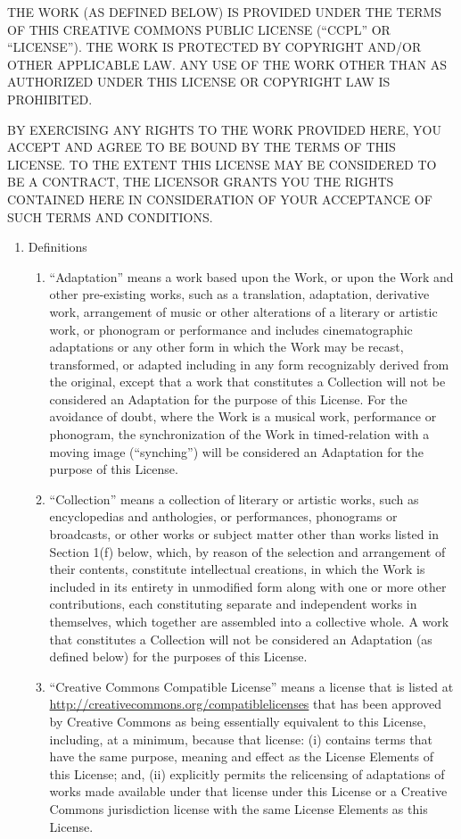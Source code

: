 \documentclass[letterpaper,10pt,english]{manual}
\begin{document}
THE WORK (AS DEFINED BELOW) IS PROVIDED UNDER THE TERMS OF THIS CREATIVE COMMONS PUBLIC LICENSE (``CCPL'' OR ``LICENSE''). THE WORK IS PROTECTED BY COPYRIGHT AND/OR OTHER APPLICABLE LAW. ANY USE OF THE WORK OTHER THAN AS AUTHORIZED UNDER THIS LICENSE OR COPYRIGHT LAW IS PROHIBITED.

BY EXERCISING ANY RIGHTS TO THE WORK PROVIDED HERE, YOU ACCEPT AND AGREE TO BE BOUND BY THE TERMS OF THIS LICENSE. TO THE EXTENT THIS LICENSE MAY BE CONSIDERED TO BE A CONTRACT, THE LICENSOR GRANTS YOU THE RIGHTS CONTAINED HERE IN CONSIDERATION OF YOUR ACCEPTANCE OF SUCH TERMS AND CONDITIONS.
\begin{enumerate}
\item {} 
Definitions
\begin{enumerate}
\item {} 
``Adaptation'' means a work based upon the Work, or upon the Work and other pre-existing works, such as a translation, adaptation, derivative work, arrangement of music or other alterations of a literary or artistic work, or phonogram or performance and includes cinematographic adaptations or any other form in which the Work may be recast, transformed, or adapted including in any form recognizably derived from the original, except that a work that constitutes a Collection will not be considered an Adaptation for the purpose of this License. For the avoidance of doubt, where the Work is a musical work, performance or phonogram, the synchronization of the Work in timed-relation with a moving image (``synching'') will be considered an Adaptation for the purpose of this License.

\item {} 
``Collection'' means a collection of literary or artistic works, such as encyclopedias and anthologies, or performances, phonograms or broadcasts, or other works or subject matter other than works listed in Section 1(f) below, which, by reason of the selection and arrangement of their contents, constitute intellectual creations, in which the Work is included in its entirety in unmodified form along with one or more other contributions, each constituting separate and independent works in themselves, which together are assembled into a collective whole. A work that constitutes a Collection will not be considered an Adaptation (as defined below) for the purposes of this License.

\item {} 
``Creative Commons Compatible License'' means a license that is listed at \href{http://creativecommons.org/compatiblelicenses}{http://creativecommons.org/compatiblelicenses} that has been approved by Creative Commons as being essentially equivalent to this License, including, at a minimum, because that license: (i) contains terms that have the same purpose, meaning and effect as the License Elements of this License; and, (ii) explicitly permits the relicensing of adaptations of works made available under that license under this License or a Creative Commons jurisdiction license with the same License Elements as this License.


\end{enumerate}
\end{enumerate}
\end{document}

